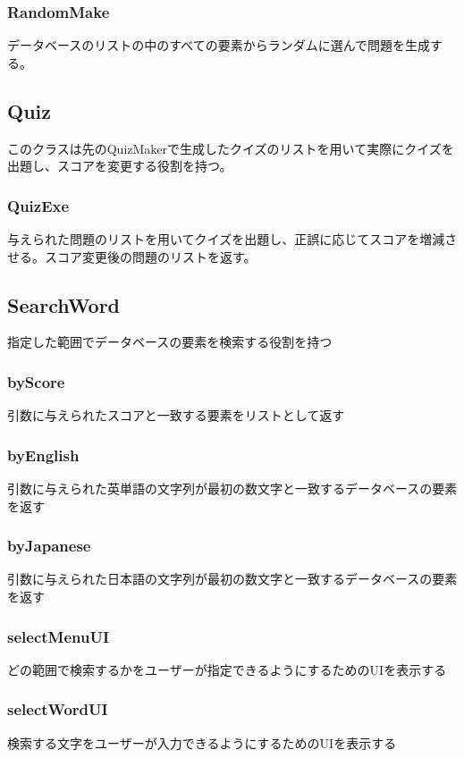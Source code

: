 \documentclass{ltjsarticle}
\begin{document}
\subsubsection{RandomMake}
データベースのリストの中のすべての要素からランダムに選んで問題を生成する。

\subsection{Quiz}
このクラスは先のQuizMakerで生成したクイズのリストを用いて実際にクイズを出題し、スコアを変更する役割を持つ。
\subsubsection{QuizExe}
与えられた問題のリストを用いてクイズを出題し、正誤に応じてスコアを増減させる。スコア変更後の問題のリストを返す。

\subsection{SearchWord}
指定した範囲でデータベースの要素を検索する役割を持つ
\subsubsection{byScore}
引数に与えられたスコアと一致する要素をリストとして返す
\subsubsection{byEnglish}
引数に与えられた英単語の文字列が最初の数文字と一致するデータベースの要素を返す
\subsubsection{byJapanese}
引数に与えられた日本語の文字列が最初の数文字と一致するデータベースの要素を返す
\subsubsection{selectMenuUI}
どの範囲で検索するかをユーザーが指定できるようにするためのUIを表示する
\subsubsection{selectWordUI}
検索する文字をユーザーが入力できるようにするためのUIを表示する
\subsubsection{}
\end{document}
